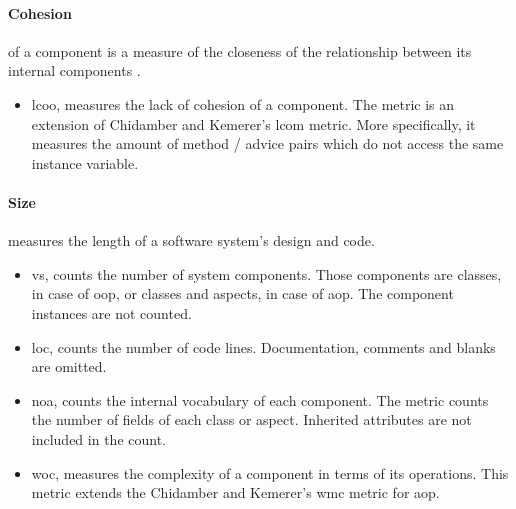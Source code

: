 \paragraph{Cohesion}of a component is a measure of the closeness of the relationship between its internal components \cite{sommerville2004software}.
	\begin{itemize}
		\item \ac{lcoo}, measures the lack of cohesion of a component.
		The metric is an extension of Chidamber and Kemerer's \cite{chidamber1994metrics} \ac{lcom} metric.
		More specifically, it measures the amount of method / advice pairs which do not access the same instance variable.
	\end{itemize}

\paragraph{Size}measures the length of a software system's design and code.
	\begin{itemize}
		\item \ac{vs}, counts the number of system components.
		Those components are classes, in case of \ac{oop}, or classes and aspects, in case of \ac{aop}.
		The component instances are not counted.

		\item \ac{loc}, counts the number of code lines.
		Documentation, comments and blanks are omitted.

		\item \ac{noa}, counts the internal vocabulary of each component.
		The metric counts the number of fields of each class or aspect.
		Inherited attributes are not included in the count.

		\item \ac{woc}, measures the complexity of a component in terms of its operations.
		This metric extends the Chidamber and Kemerer's \cite{chidamber1994metrics} \ac{wmc} metric for \ac{aop}.
	\end{itemize}
